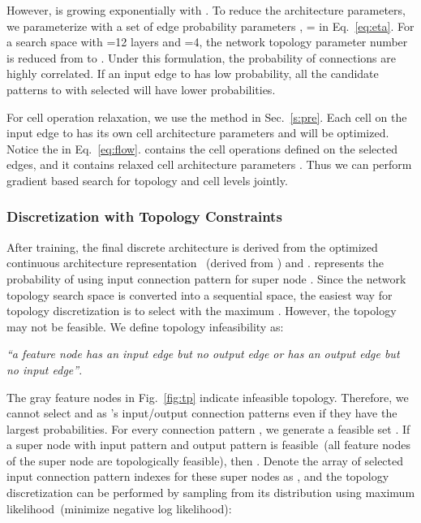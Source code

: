 \documentclass[final]{cvpr}
\begin{document}
However,  is growing exponentially with . To reduce the architecture parameters, we parameterize  with a set of edge probability parameters , = in Eq.~\ref{eq:eta}. For a search space with =12 layers and =4, the network topology parameter number is reduced from  to . Under this formulation, the probability  of connections are highly correlated. If an input edge  to  has low probability, all the candidate patterns to  with  selected will have lower probabilities.

For cell operation relaxation, we use the method in Sec.~\ref{s:pre}. Each cell on the input edge  to  has its own cell architecture parameters  and will be optimized. Notice the  in Eq.~\ref{eq:flow}. contains the cell operations defined on the selected edges, and it contains relaxed cell architecture parameters . Thus we can perform gradient based search for topology and cell levels jointly.

\subsubsection{Discretization with Topology Constraints}
\label{s:dis}
After training, the final discrete architecture is derived from the optimized continuous architecture representation ~(derived from ) and .  represents the probability of using input connection pattern  for super node . Since the network topology search space is converted into a sequential space, the easiest way for topology discretization is to select  with the maximum . However, the topology may not be feasible. We define topology infeasibility as:
\begin{center}
\emph{``a feature node has an input edge but no output edge or has an output edge but no input edge''}. 
\end{center}
The gray feature nodes in Fig.~\ref{fig:tp} indicate infeasible topology. Therefore, we cannot select  and  as 's input/output connection patterns even if they have the largest probabilities. For every connection pattern , we generate a feasible set . If a super node with input pattern  and output pattern  is feasible~(all feature nodes of the super node are topologically feasible), then . Denote the array of selected input connection pattern indexes for these  super nodes as , and the topology discretization can be performed by sampling  from its distribution  using maximum likelihood~(minimize negative log likelihood): 
\end{document}
